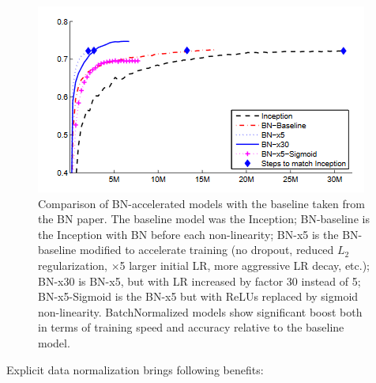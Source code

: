 \documentclass[thesis=B,english]{FITthesis}[2019/12/23]
\begin{document}
\begin{figure}
	\centering
	\includegraphics{images/batchnorm_performance.png}
	\caption{Comparison of BN-accelerated models with the baseline taken from the BN paper\cite{batchnorm}. The baseline model was the Inception\cite{going_deeper}; BN-baseline is the Inception with BN before each non-linearity; BN-x5 is the BN-baseline modified to accelerate training (no dropout, reduced $L_2$ regularization, $\times$5 larger initial LR, more aggressive LR decay, etc.); BN-x30 is BN-x5, but with LR increased by factor 30 instead of 5; BN-x5-Sigmoid is the BN-x5 but with ReLUs replaced by sigmoid non-linearity. BatchNormalized models show significant boost both in terms of training speed and accuracy relative to the baseline model.}
\end{figure}

Explicit data normalization brings following benefits:
\end{document}
